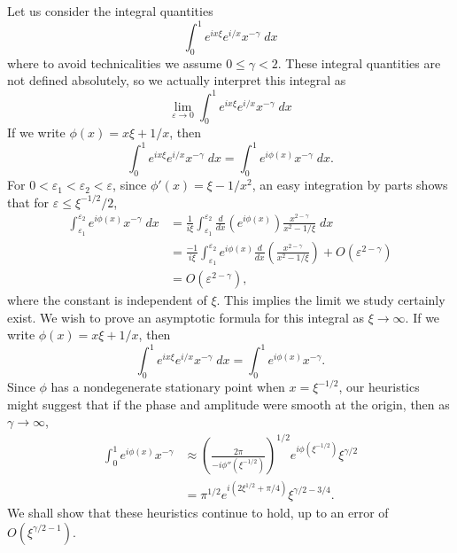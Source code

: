 \begin{example}
  Let us consider the integral quantities
  \[ \int_0^1 e^{i x \xi} e^{i/x} x^{-\gamma}\; dx \]
  where to avoid technicalities we assume $0 \leq \gamma < 2$. These integral quantities are not defined absolutely, so we actually interpret this integral as
  \[ \lim_{\varepsilon \to 0} \int_0^1 e^{i x \xi} e^{i/x} x^{-\gamma}\; dx \]
  If we write $\phi(x) = x \xi + 1/x$, then
  \[ \int_0^1 e^{i x \xi} e^{i/x} x^{-\gamma}\; dx = \int_0^1 e^{i\phi(x)} x^{-\gamma}\; dx. \]
  For $0 < \varepsilon_1 < \varepsilon_2 < \varepsilon$, since $\phi'(x) = \xi - 1/x^2$, an easy integration by parts shows that for $\varepsilon \leq \xi^{-1/2}/2$,
  \begin{equation} \label{riemannsingularityibp}
  \begin{aligned} 
    \int_{\varepsilon_1}^{\varepsilon_2} e^{i\phi(x)} x^{-\gamma}\; dx &= \frac{1}{i \xi} \int_{\varepsilon_1}^{\varepsilon_2} \frac{d}{dx} \left( e^{i \phi(x)} \right) \frac{x^{2-\gamma}}{x^2 - 1/\xi}\; dx\\
    &= \frac{-1}{i \xi} \int_{\varepsilon_1}^{\varepsilon_2} e^{i \phi(x)} \frac{d}{dx} \left( \frac{x^{2-\gamma}}{x^2 - 1/\xi} \right) + O(\varepsilon^{2-\gamma})\\
    &= O(\varepsilon^{2-\gamma}),
  \end{aligned}
  \end{equation}
  where the constant is independent of $\xi$. This implies the limit we study certainly exist. We wish to prove an asymptotic formula for this integral as $\xi \to \infty$. If we write $\phi(x) = x \xi + 1/x$, then
  \[ \int_0^1 e^{i x \xi} e^{i/x} x^{-\gamma}\; dx = \int_0^1 e^{i \phi(x)} x^{-\gamma}. \]
  Since $\phi$ has a nondegenerate stationary point when $x = \xi^{-1/2}$, our heuristics might suggest that if the phase and amplitude were smooth at the origin, then as $\gamma \to \infty$,
  \begin{align*}
    \int_0^1 e^{i\phi(x)} x^{-\gamma} &\approx \left( \frac{2\pi}{-i \phi''(\xi^{-1/2})} \right)^{1/2} e^{i\phi(\xi^{-1/2})} \xi^{\gamma/2}\\
    &= \pi^{1/2} e^{i(2 \xi^{1/2} + \pi/4)} \xi^{\gamma/2 - 3/4}.
  \end{align*}
  We shall show that these heuristics continue to hold, up to an error of $O(\xi^{\gamma/2 - 1})$.


\end{example}
